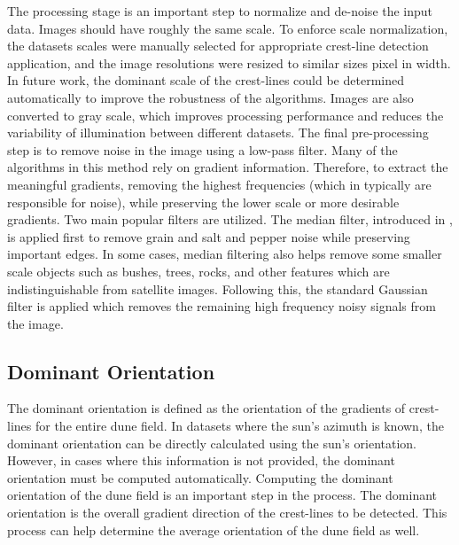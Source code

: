 The processing stage is an important step to normalize and de-noise the input data. Images should have roughly the same scale. To enforce scale normalization, the datasets scales were manually selected for appropriate crest-line detection application, and the image resolutions were resized to similar sizes pixel in width. In future work, the dominant scale of the crest-lines could be determined automatically to improve the robustness of the algorithms. Images are also converted to gray scale, which improves processing performance and reduces the variability of illumination between different datasets. The final pre-processing step is to remove noise in the image using a low-pass filter. Many of the algorithms in this method rely on gradient information. Therefore, to extract the meaningful gradients, removing the highest frequencies (which in typically are responsible for noise), while preserving the lower scale or more desirable gradients. Two main popular filters are utilized. The median filter, introduced in \cite{huang_median_filtering_algorithm}, is applied first to remove grain and salt and pepper noise while preserving important edges. In some cases, median filtering also helps remove some smaller scale objects such as bushes, trees, rocks, and other features which are indistinguishable from satellite images. Following this, the standard Gaussian filter is applied which removes the remaining high frequency noisy signals from the image.

\subsection{Dominant Orientation} \label{subsec:dominant_orientation}
The dominant orientation is defined as the orientation of the gradients of crest-lines for the entire dune field. In datasets where the sun's azimuth is known, the dominant orientation can be directly calculated using the sun's orientation. However, in cases where this information is not provided, the dominant orientation must be computed automatically. Computing the dominant orientation of the dune field is an important step in the process. The dominant orientation is the overall gradient direction of the crest-lines to be detected. This process can help determine the average orientation of the dune field as well.

